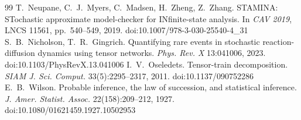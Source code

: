 \documentclass[11pt]{article}
\begin{document}
\begin{thebibliography}{99}
 T.~Neupane, C.~J.~Myers, C.~Madsen, H.~Zheng, Z.~Zhang. STAMINA: STochastic approximate model-checker for INfinite-state analysis. In \emph{CAV 2019}, LNCS 11561, pp.~540--549, 2019. doi:10.1007/978-3-030-25540-4\_31
 S.~B.~Nicholson, T.~R.~Gingrich. Quantifying rare events in stochastic reaction-diffusion dynamics using tensor networks. \emph{Phys. Rev. X} 13:041006, 2023. doi:10.1103/PhysRevX.13.041006
 I.~V.~Oseledets. Tensor-train decomposition. \emph{SIAM J. Sci. Comput.} 33(5):2295--2317, 2011. doi:10.1137/090752286
 E.~B.~Wilson. Probable inference, the law of succession, and statistical inference. \emph{J. Amer. Statist. Assoc.} 22(158):209--212, 1927. doi:10.1080/01621459.1927.10502953
\end{thebibliography}
\end{document}
